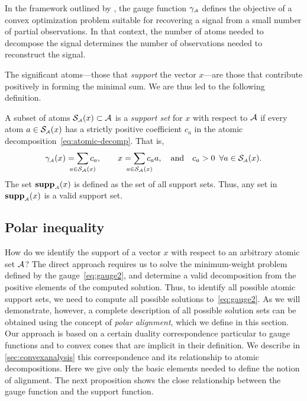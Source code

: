 In the framework outlined by \citet{chandrasekaran2012convex}, the gauge
function $\gamma_{\scriptscriptstyle\mathcal{A}}$ defines the objective of a convex optimization problem
suitable for recovering a signal from a small number of partial observations. In
that context, the number of atoms needed to decompose the signal determines the
number of observations needed to reconstruct the signal.

The significant atoms---those that \emph{support} the
vector $x$---are those that contribute positively in forming the minimal sum. We
are thus led to the following definition.

\begin{definition} \label{def:atomic_support} A subset of atoms
    $\operatorname{\mathcal{S}_{\scriptscriptstyle\mathcal{A}}}(x)\subset\mathcal{A}$ is a \emph{support set} for $x$ with respect to
    $\mathcal{A}$ if every atom $a\in\operatorname{\mathcal{S}_{\scriptscriptstyle\mathcal{A}}}(x)$ has a strictly positive coefficient
    $c_a$ in the atomic decomposition~\eqref{eq:atomic-decomp}. That is,
    \begin{equation}
      \gauge\As(x) = \sum_{\mathclap{a\in\suppa(x)}} c_a,
      \qquad x = \sum_{\mathclap{a\in\suppa(x)}} c_aa,
      \text{and} c_a > 0\enspace \forall a\in\suppa(x).
    \end{equation}
    The set $\operatorname{\hbox{\rm\textbf{supp}}}_{\scriptscriptstyle\mathcal{A}}(x)$ is defined as the set of all support
    sets. Thus, any set in $\operatorname{\hbox{\rm\textbf{supp}}}_{\scriptscriptstyle\mathcal{A}}(x)$ is a valid support set. 
  \end{definition}

\subsection{Polar inequality} \label{sec:approach}

How do we identify the support of a vector $x$ with respect to an arbitrary
atomic set $\mathcal{A}$? The direct approach requires us to solve the minimum-weight
problem defined by the gauge~\eqref{eq:gauge2}, and determine a valid decomposition
from the positive elements of the computed solution. Thus, to identify all
possible atomic support sets, we need to compute all possible solutions
to~\eqref{eq:gauge2}. As we will demonstrate, however, a complete description of all
possible solution sets can be obtained using the concept of \emph{polar
alignment}, which we define in this section. Our approach is based on a certain
duality correspondence particular to gauge functions and to convex cones that
are implicit in their definition. We describe in \autoref{sec:convexanalysis} this correspondence and its relationship to atomic decompositions. Here we give only the basic elements needed to define the notion of alignment. The next proposition shows the close relationship between the gauge function and the support function. 

